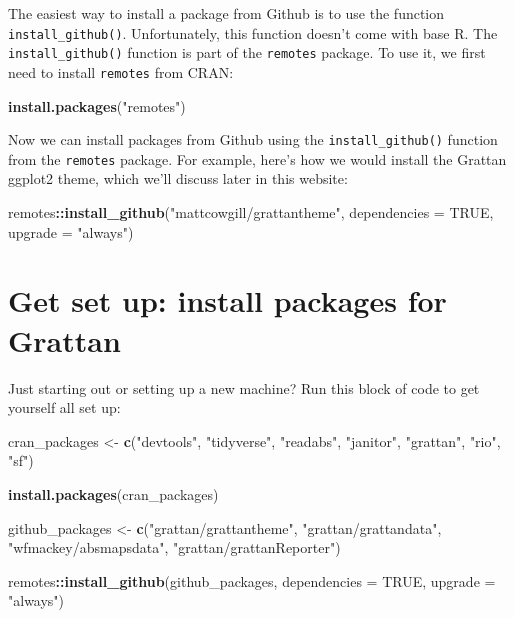 \documentclass[
]{book}
\newenvironment{Shaded}{\begin{snugshade}}{\end{snugshade}}
\newcommand{\DataTypeTok}[1]{\textcolor[rgb]{0.13,0.29,0.53}{#1}}
\newcommand{\KeywordTok}[1]{\textcolor[rgb]{0.13,0.29,0.53}{\textbf{#1}}}
\newcommand{\NormalTok}[1]{#1}
\newcommand{\OperatorTok}[1]{\textcolor[rgb]{0.81,0.36,0.00}{\textbf{#1}}}
\newcommand{\OtherTok}[1]{\textcolor[rgb]{0.56,0.35,0.01}{#1}}
\newcommand{\StringTok}[1]{\textcolor[rgb]{0.31,0.60,0.02}{#1}}
\begin{document}
The easiest way to install a package from Github is to use the function \texttt{install\_github()}. Unfortunately, this function doesn't come with base R. The \texttt{install\_github()} function is part of the \texttt{remotes} package. To use it, we first need to install \texttt{remotes} from CRAN:

\begin{Shaded}
\begin{Highlighting}[]
\KeywordTok{install.packages}\NormalTok{(}\StringTok{"remotes"}\NormalTok{)}
\end{Highlighting}
\end{Shaded}

Now we can install packages from Github using the \texttt{install\_github()} function from the \texttt{remotes} package. For example, here's how we would install the Grattan ggplot2 theme, which we'll discuss later in this website:

\begin{Shaded}
\begin{Highlighting}[]
\NormalTok{remotes}\OperatorTok{::}\KeywordTok{install\_github}\NormalTok{(}\StringTok{"mattcowgill/grattantheme"}\NormalTok{, }\DataTypeTok{dependencies =} \OtherTok{TRUE}\NormalTok{, }\DataTypeTok{upgrade =} \StringTok{"always"}\NormalTok{)}
\end{Highlighting}
\end{Shaded}

\hypertarget{install-grattan-packages}{%
\section{Get set up: install packages for Grattan}\label{install-grattan-packages}}

Just starting out or setting up a new machine? Run this block of code to get yourself all set up:

\begin{Shaded}
\begin{Highlighting}[]
\NormalTok{cran\_packages \textless{}{-}}\StringTok{ }\KeywordTok{c}\NormalTok{(}\StringTok{"devtools"}\NormalTok{, }\StringTok{"tidyverse"}\NormalTok{, }\StringTok{"readabs"}\NormalTok{, }\StringTok{"janitor"}\NormalTok{, }\StringTok{"grattan"}\NormalTok{,}
                   \StringTok{"rio"}\NormalTok{, }\StringTok{"sf"}\NormalTok{)}

\KeywordTok{install.packages}\NormalTok{(cran\_packages)}

\NormalTok{github\_packages \textless{}{-}}\StringTok{ }\KeywordTok{c}\NormalTok{(}\StringTok{"grattan/grattantheme"}\NormalTok{, }\StringTok{"grattan/grattandata"}\NormalTok{,}
                     \StringTok{"wfmackey/absmapsdata"}\NormalTok{, }\StringTok{"grattan/grattanReporter"}\NormalTok{)}

\NormalTok{remotes}\OperatorTok{::}\KeywordTok{install\_github}\NormalTok{(github\_packages,}
                        \DataTypeTok{dependencies =} \OtherTok{TRUE}\NormalTok{,}
                        \DataTypeTok{upgrade =} \StringTok{"always"}\NormalTok{)}
\end{Highlighting}
\end{Shaded}
\end{document}
